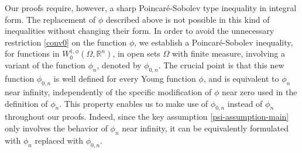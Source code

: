 \documentclass[leqno,11pt]{amsart}%
\numberwithin{equation}{section}
\def\Rn{{\mathbb R}^{n}}
\def\rn{\Rn}
\theoremstyle{definition}
\numberwithin{equation}{section}
\begin{document}
Our proofs require, however, a sharp Poincar\'e-Sobolev type inequality in integral form. The
replacement of $\phi$ described above is not possible in this kind of inequalities without changing their form. In order to avoid the unnecessary restriction \eqref{conv0} on the function $\phi$, 
 we establish a Poincar\'e-Sobolev inequality, for functions in $W^{1,\phi}_0(\Omega, \rn)$, in open sets $\Omega$ with finite measure, involving a variant of the function $\phi_n$, denoted by $ \phi_{0,n}$. The crucial point is that this new function $  \phi_{0,n}$ is well defined for every Young function $\phi$, and is equivalent to $\phi_n$ near infinity, independently of the specific modification of  $\phi$ near zero used in the definition of $\phi_n$. This  property enables us to make use of $\phi_{0,n}$ instead of $\phi_n$ throughout our proofs. Indeed, since  the key assumption 
 \eqref{psi-assumption-main} only involves the behavior of $\phi_n$ near infinity, it can be equivalently formulated with $\phi_n$ replaced with $\phi_{0,n}$.
\end{document}
